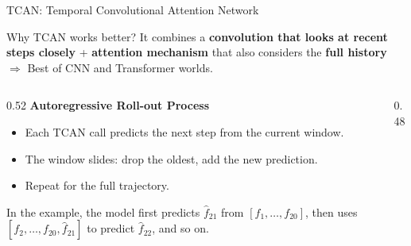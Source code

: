\begin{frame}{\Large TCAN: Temporal Convolutional Attention Network}
  \vspace{-0.3em}
  \begin{block}{Why TCAN works better?}
    It combines a \textbf{convolution that looks at recent
    steps closely} + \textbf{attention mechanism} that also considers
    the \textbf{full history} $\Rightarrow$ Best of CNN and Transformer worlds.
  \end{block}
\begin{columns}[t]
  \begin{column}{0.52\textwidth}
    \small \textbf{Autoregressive Roll-out Process}
    \vspace{0.1em}
    \begin{itemize}
      \item Each TCAN call predicts the next step from the current window.
      \item The window slides: drop the oldest, add the new prediction.
      \item Repeat for the full trajectory.
    \end{itemize}

    \scriptsize In the example, the model first predicts $\hat{f}_{21}$
    from $[f_1,\dots,f_{20}]$, then uses $[f_2,\dots,f_{20},\hat{f}_{21}]$
    to predict $\hat{f}_{22}$, and so on.
  \end{column}
  \begin{column}{0.48\textwidth}
    \begin{center}
\end{center}
\end{column}
\end{columns}
\end{frame}
